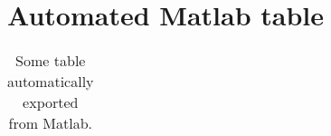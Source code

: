 \section{Automated Matlab table}\label{sec:1d}
\begin{table}[H]
\caption{Some table automatically exported from Matlab.}\label{tab:matlab_table}
\centering
\begin{tabular}{|l|l|l|l|l|}
\hline

\end{tabular}
\end{table}
